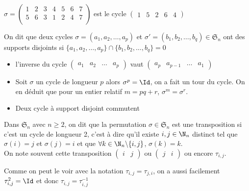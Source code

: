 \begin{ex}
$\sigma=\begin{pmatrix}
1 &2 &3 &4 &5 &6 &7\\
5 &6 & 3 & 1 & 2& 4 & 7\\
\end{pmatrix}$ est le cycle $\begin{pmatrix}
1&5&2&6&4
\end{pmatrix}$
\end{ex}
\begin{defini}
    On dit que deux cycles $\sigma=(a_1,a_2,\dots,a_p)$ et $\sigma'=(b_1,b_2,\dots,b_q)\in\mathfrak{S}_n$ ont des supports disjoints si
    $\{a_1,a_2,\dots,a_p\}\cap\{b_1,b_2,\dots,b_q\}=0$
\end{defini}
\begin{prop}
\begin{itemize}
\item l'inverse du cycle $\begin{pmatrix}
    a_1&a_2&\dots &a_p
\end{pmatrix}$ vaut $\begin{pmatrix}
a_p&a_{p-1}&\dots &a_1
\end{pmatrix}$
\item Soit $\sigma$ un cycle de longueur $p$ alors $\sigma^p=\Id$, on a fait un tour du cycle.
On en déduit que pour un entier relatif $m=pq+r$, $\sigma^m=\sigma^r$.
\item Deux cycle à support disjoint commutent
\end{itemize}
\end{prop}
\begin{defini}[Transposition]
Dans $\mathfrak{S}_n$ avec $n\geq 2$, on dit que la permutation $\sigma\in\mathfrak{S}_n$ est une transposition si c'est un cycle de longueur 2, c'est à dire qu'il existe $i,j\in\N_n$ distinct tel que $\sigma(i)=j$ et $\sigma(j)=i$ et que $\forall k\in\N_n\backslash\{i,j\}$, $\sigma(k)=k$.\\
On note souvent cette transposition $\begin{pmatrix}
i & j
\end{pmatrix}$ ou $\begin{pmatrix}
j & i
\end{pmatrix}$ ou encore $\tau_{i,j}$.
\end{defini}
\begin{prop}
Comme on peut le voir avec la notation $\tau_{i,j}=\tau_{j,i}$, on a aussi facilement $\tau^2_{i,j}=\Id$ et donc $\tau_{i,j}=\tau^{-1}_{i,j}$\\
\end{prop}
